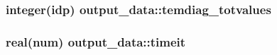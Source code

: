 \subsubsection[{\texorpdfstring{temdiag\+\_\+totvalues}{temdiag_totvalues}}]{\setlength{\rightskip}{0pt plus 5cm}integer(idp) output\+\_\+data\+::temdiag\+\_\+totvalues}\hypertarget{namespaceoutput__data_a85fe1c4047057dc4292320e82cae2cda}{}\label{namespaceoutput__data_a85fe1c4047057dc4292320e82cae2cda}
\subsubsection[{\texorpdfstring{timeit}{timeit}}]{\setlength{\rightskip}{0pt plus 5cm}real(num) output\+\_\+data\+::timeit}\hypertarget{namespaceoutput__data_adee8dc0fd9ff0328c325cfc24be39db3}{}\label{namespaceoutput__data_adee8dc0fd9ff0328c325cfc24be39db3}
